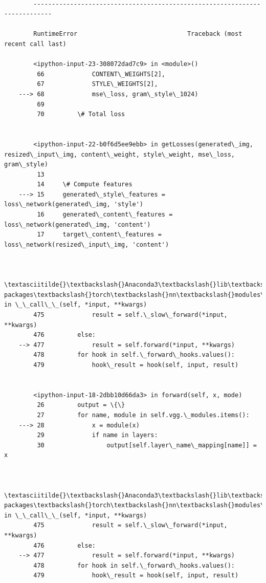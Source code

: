 \documentclass[11pt]{article}
\begin{document}
    \begin{Verbatim}[commandchars=\\\{\}]

        ---------------------------------------------------------------------------

        RuntimeError                              Traceback (most recent call last)

        <ipython-input-23-308072dad7c9> in <module>()
         66             CONTENT\_WEIGHTS[2],
         67             STYLE\_WEIGHTS[2],
    ---> 68             mse\_loss, gram\_style\_1024)
         69 
         70         \# Total loss
    

        <ipython-input-22-b0f6d5ee9ebb> in getLosses(generated\_img, resized\_input\_img, content\_weight, style\_weight, mse\_loss, gram\_style)
         13 
         14     \# Compute features
    ---> 15     generated\_style\_features = loss\_network(generated\_img, 'style')
         16     generated\_content\_features = loss\_network(generated\_img, 'content')
         17     target\_content\_features = loss\_network(resized\_input\_img, 'content')
    

        \textasciitilde{}\textbackslash{}Anaconda3\textbackslash{}lib\textbackslash{}site-packages\textbackslash{}torch\textbackslash{}nn\textbackslash{}modules\textbackslash{}module.py in \_\_call\_\_(self, *input, **kwargs)
        475             result = self.\_slow\_forward(*input, **kwargs)
        476         else:
    --> 477             result = self.forward(*input, **kwargs)
        478         for hook in self.\_forward\_hooks.values():
        479             hook\_result = hook(self, input, result)
    

        <ipython-input-18-2dbb10d66da3> in forward(self, x, mode)
         26         output = \{\}
         27         for name, module in self.vgg.\_modules.items():
    ---> 28             x = module(x)
         29             if name in layers:
         30                 output[self.layer\_name\_mapping[name]] = x
    

        \textasciitilde{}\textbackslash{}Anaconda3\textbackslash{}lib\textbackslash{}site-packages\textbackslash{}torch\textbackslash{}nn\textbackslash{}modules\textbackslash{}module.py in \_\_call\_\_(self, *input, **kwargs)
        475             result = self.\_slow\_forward(*input, **kwargs)
        476         else:
    --> 477             result = self.forward(*input, **kwargs)
        478         for hook in self.\_forward\_hooks.values():
        479             hook\_result = hook(self, input, result)
    


\end{Verbatim}
\end{document}
